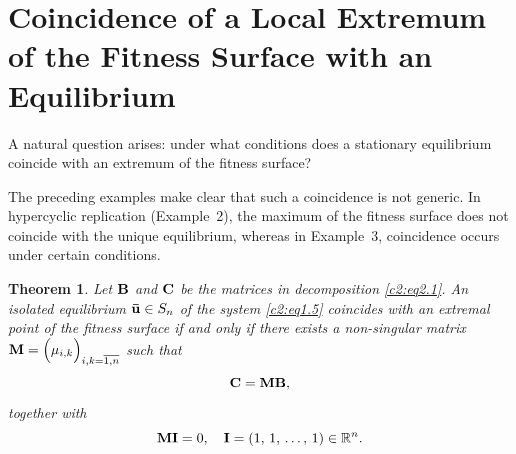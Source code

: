 \documentclass[12pt]{report}
\newcommand{\R}{\mathbb{R}}
\newtheorem{theorem}{Theorem}[section]
\theoremstyle{definition}
\theoremstyle{remark}
\begin{document}
\clearpage

\section{Coincidence of a Local Extremum of the Fitness Surface with an Equilibrium}
\label{c2:section:2.3}
A natural question arises: under what conditions does a stationary equilibrium coincide with an extremum of the fitness surface?

The preceding examples make clear that such a coincidence is not generic. In hypercyclic replication (Example~2), the maximum of the fitness surface does not coincide with the unique equilibrium, whereas in Example~3, coincidence occurs under certain conditions.

\begin{theorem}\label{c2:t2.1}
	Let ${\bf B}$ and ${\bf C}$ be the matrices in decomposition \eqref{c2:eq2.1}. An isolated equilibrium ${\bf \bar{u}} \in S_{n}$ of the system \eqref{c2:eq1.5} coincides with an extremal point of the fitness surface if and only if there exists a non-singular matrix ${\bf M} = \Big(\mu_{i,k}\Big)_{i, k = \overline{1, n}}$ such that
	\begin{equation}
		{\bf C = MB},
		\label{c2:eq2.5}
	\end{equation}
	together with
	\begin{equation}
		{\bf MI} = 0, \quad {\bf I} = (1,\, 1,\, \ldots,\, 1) \in \R^{n}.
		\label{c2:eq2.6}
	\end{equation}
\end{theorem}
\end{document}
